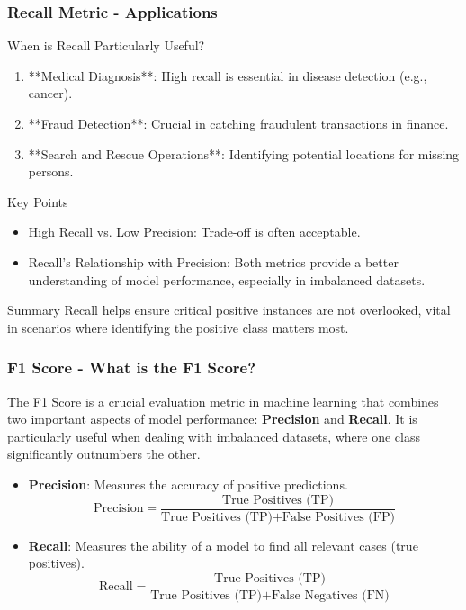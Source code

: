 \documentclass[aspectratio=169]{beamer}
\begin{document}
\begin{frame}[fragile]
    \frametitle{Recall Metric - Applications}
    \begin{block}{When is Recall Particularly Useful?}
        \begin{enumerate}
            \item **Medical Diagnosis**: High recall is essential in disease detection (e.g., cancer).
            \item **Fraud Detection**: Crucial in catching fraudulent transactions in finance.
            \item **Search and Rescue Operations**: Identifying potential locations for missing persons.
        \end{enumerate}
    \end{block}
    \begin{block}{Key Points}
        \begin{itemize}
            \item High Recall vs. Low Precision: Trade-off is often acceptable.
            \item Recall's Relationship with Precision: Both metrics provide a better understanding of model performance, especially in imbalanced datasets.
        \end{itemize}
    \end{block}
    \begin{block}{Summary}
        Recall helps ensure critical positive instances are not overlooked, vital in scenarios where identifying the positive class matters most.
    \end{block}
\end{frame}

\begin{frame}[fragile]
    \frametitle{F1 Score - What is the F1 Score?}
    The F1 Score is a crucial evaluation metric in machine learning that combines two important aspects of model performance: 
    \textbf{Precision} and \textbf{Recall}. It is particularly useful when dealing with imbalanced datasets, where one class significantly outnumbers the other.

    \begin{itemize}
        \item \textbf{Precision}: Measures the accuracy of positive predictions.
        \begin{equation}
            \text{Precision} = \frac{\text{True Positives (TP)}}{\text{True Positives (TP)} + \text{False Positives (FP)}}
        \end{equation}

        \item \textbf{Recall}: Measures the ability of a model to find all relevant cases (true positives).
        \begin{equation}
            \text{Recall} = \frac{\text{True Positives (TP)}}{\text{True Positives (TP)} + \text{False Negatives (FN)}}
        \end{equation}
    \end{itemize}
\end{frame}
\end{document}
